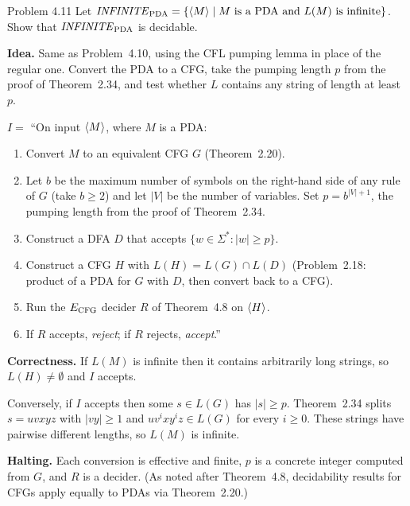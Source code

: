 \begin{question}{Problem 4.11}
Let $\mathit{INFINITE}_{\mathrm{PDA}}=\{\langle M\rangle\mid M\text{ is a PDA and }L(M)\text{ is infinite}\}$.
Show that $\mathit{INFINITE}_{\mathrm{PDA}}$ is decidable.
\end{question}
\begin{soln}
\textbf{Idea.} Same as Problem~4.10, using the CFL pumping lemma in place of the regular one. Convert the PDA to a CFG, take the pumping length $p$ from the proof of Theorem~2.34, and test whether $L$ contains any string of length at least~$p$.

$I=$ ``On input $\langle M\rangle$, where $M$ is a PDA:
\begin{enumerate}
\item Convert $M$ to an equivalent CFG $G$ (Theorem~2.20).
\item Let $b$ be the maximum number of symbols on the right-hand side of any rule of $G$ (take $b\ge 2$) and let $|V|$ be the number of variables. Set $p=b^{|V|+1}$, the pumping length from the proof of Theorem~2.34.
\item Construct a DFA $D$ that accepts $\{w\in\Sigma^*:|w|\ge p\}$.
\item Construct a CFG $H$ with $L(H)=L(G)\cap L(D)$ (Problem~2.18: product of a PDA for $G$ with $D$, then convert back to a CFG).
\item Run the $E_{\mathrm{CFG}}$ decider $R$ of Theorem~4.8 on $\langle H\rangle$.
\item If $R$ accepts, \emph{reject}; if $R$ rejects, \emph{accept}.''
\end{enumerate}

\textbf{Correctness.} If $L(M)$ is infinite then it contains arbitrarily long strings, so $L(H)\ne\emptyset$ and $I$ accepts.

Conversely, if $I$ accepts then some $s\in L(G)$ has $|s|\ge p$. Theorem~2.34 splits $s=uvxyz$ with $|vy|\ge 1$ and $uv^ixy^iz\in L(G)$ for every $i\ge 0$. These strings have pairwise different lengths, so $L(M)$ is infinite.

\textbf{Halting.} Each conversion is effective and finite, $p$ is a concrete integer computed from $G$, and $R$ is a decider. (As noted after Theorem~4.8, decidability results for CFGs apply equally to PDAs via Theorem~2.20.)
\end{soln}

